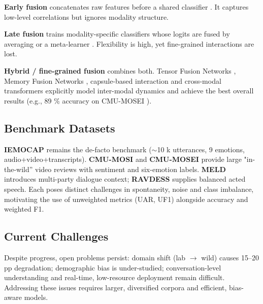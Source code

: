 \documentclass[12pt]{article}
\begin{document}
\textbf{Early fusion} concatenates raw features before a shared
classifier \cite{poria2017review}.  It captures low-level correlations
but ignores modality structure.

\textbf{Late fusion} trains modality-specific classifiers whose logits
are fused by averaging or a meta-learner
\cite{wang2019words}.  Flexibility is high, yet fine-grained
interactions are lost.

\textbf{Hybrid / fine-grained fusion} combines both.  Tensor Fusion
Networks \cite{zadeh2018multimodal_tfn}, Memory Fusion Networks
\cite{zadeh2018mfn}, capsule-based interaction
\cite{wang2019words} and cross-modal transformers
\cite{tsai2019mult} explicitly model inter-modal dynamics and achieve
the best overall results (e.g., 89 \% accuracy on CMU-MOSEI
\cite{mittal2020m3er}).

\subsection{Benchmark Datasets}
\textbf{IEMOCAP} \cite{busso2008iemocap} remains the de-facto benchmark
($\sim$10 k utterances, 9 emotions, audio+video+transcripts).  
\textbf{CMU-MOSI} \cite{zadeh2016mosi} and
\textbf{CMU-MOSEI} \cite{zadeh2018multimodal} provide large
"in-the-wild'' video reviews with sentiment and six-emotion labels.
\textbf{MELD} \cite{poria2018meld} introduces multi-party dialogue
context; \textbf{RAVDESS} \cite{livingstone2018ravdess} supplies
balanced acted speech.  Each poses distinct challenges in spontaneity,
noise and class imbalance, motivating the use of unweighted metrics
(UAR, UF1) alongside accuracy and weighted F1.

\subsection{Current Challenges}
Despite progress, open problems persist: domain shift (lab $\rightarrow$
wild) causes 15–20 pp degradation; demographic bias is under-studied;
conversation-level understanding and real-time, low-resource deployment
remain difficult.  Addressing these issues requires larger,
diversified corpora and efficient, bias-aware models.
\end{document}
